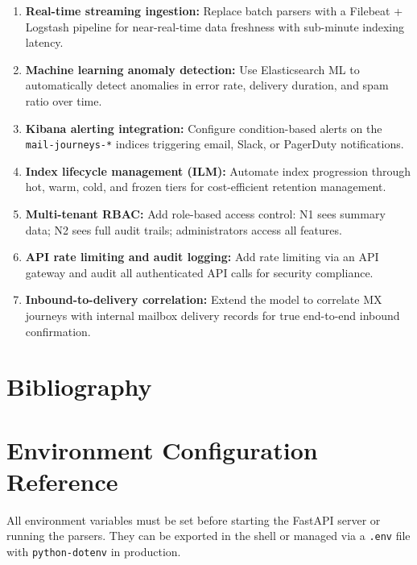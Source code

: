 \documentclass[12pt,a4paper,oneside]{report}
\begin{document}
\begin{enumerate}
  \item \textbf{Real-time streaming ingestion:} Replace batch parsers with a Filebeat + Logstash pipeline for near-real-time data freshness with sub-minute indexing latency.
  \item \textbf{Machine learning anomaly detection:} Use Elasticsearch ML to automatically detect anomalies in error rate, delivery duration, and spam ratio over time.
  \item \textbf{Kibana alerting integration:} Configure condition-based alerts on the \texttt{mail-journeys-*} indices triggering email, Slack, or PagerDuty notifications.
  \item \textbf{Index lifecycle management (ILM):} Automate index progression through hot, warm, cold, and frozen tiers for cost-efficient retention management.
  \item \textbf{Multi-tenant RBAC:} Add role-based access control: N1 sees summary data; N2 sees full audit trails; administrators access all features.
  \item \textbf{API rate limiting and audit logging:} Add rate limiting via an API gateway and audit all authenticated API calls for security compliance.
  \item \textbf{Inbound-to-delivery correlation:} Extend the model to correlate MX journeys with internal mailbox delivery records for true end-to-end inbound confirmation.
\end{enumerate}

\chapter*{Bibliography}
{}

\nocite{*}
\printbibliography[heading=none]

\appendix
\chapter{Environment Configuration Reference}

All environment variables must be set before starting the FastAPI server or running the parsers.
They can be exported in the shell or managed via a \texttt{.env} file with \texttt{python-dotenv} in production.
\end{document}
